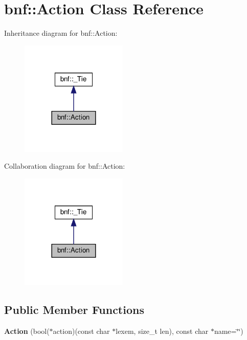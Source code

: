 \section{bnf\+:\+:Action Class Reference}
\label{classbnf_1_1_action}


Inheritance diagram for bnf\+:\+:Action\+:
\nopagebreak
\begin{figure}[H]
\begin{center}
\leavevmode
\includegraphics[width=144pt]{classbnf_1_1_action__inherit__graph}
\end{center}
\end{figure}


Collaboration diagram for bnf\+:\+:Action\+:
\nopagebreak
\begin{figure}[H]
\begin{center}
\leavevmode
\includegraphics[width=144pt]{classbnf_1_1_action__coll__graph}
\end{center}
\end{figure}
\subsection*{Public Member Functions}
\begin{DoxyCompactItemize}
\item 
\mbox{\label{classbnf_1_1_action_a6c60ae74d4c9137caee753dbd4db02e6}} 
{\bfseries Action} (bool($\ast$action)(const char $\ast$lexem, size\+\_\+t len), const char $\ast$name=\char`\"{}\char`\"{})
\end{DoxyCompactItemize}
